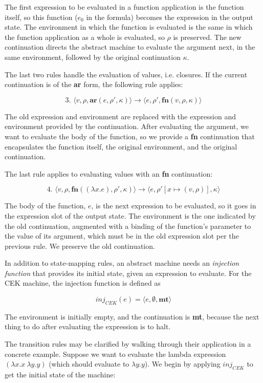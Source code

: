 \documentclass{article}
\begin{document}
The first expression to be evaluated in a function application is the function itself, so this function ($e_0$ in the formula) becomes the expression in the output state. The environment in which the function is evaluated is the same in which the function application as a whole is evaluated, so $\rho$ is preserved. The new continuation directs the abstract machine to evaluate the argument next, in the same environment, followed by the original continuation $\kappa$.

The last two rules handle the evaluation of values, i.e. closures. If the current continuation is of the \textbf{ar} form, the following rule applies:

$$
\text{3. }
\langle v, \rho, \textbf{ar}(e, \rho', \kappa) \rangle
\to
\langle e, \rho', \textbf{fn}(v, \rho, \kappa) \rangle
$$

The old expression and environment are replaced with the expression and environment provided by the continuation. After evaluating the argument, we want to evaluate the body of the function, so we provide a \textbf{fn} continuation that encapsulates the function itself, the original environment, and the original continuation.

The last rule applies to evaluating values with an \textbf{fn} continuation:

$$
\text{4. }
\langle v, \rho, \textbf{fn}((\lambda x.e), \rho', \kappa) \rangle
\to
\langle e, \rho'[x \mapsto (v, \rho)], \kappa \rangle
$$

The body of the function, $e$, is the next expression to be evaluated, so it goes in the expression slot of the output state. The environment is the one indicated by the old continuation, augmented with a binding of the function's parameter to the value of its argument, which must be in the old expression slot per the previous rule. We preserve the old continuation.

In addition to state-mapping rules, an abstract machine needs an \textit{injection function} that provides its initial state, given an expression to evaluate. For the CEK machine, the injection function is defined as

$$ inj_{CEK}(e) = \langle e, \emptyset, \textbf{mt} \rangle $$

The environment is initially empty, and the continuation is \textbf{mt}, because the next thing to do after evaluating the expression is to halt.

The transition rules may be clarified by walking through their application in a concrete example. Suppose we want to evaluate the lambda expression $(\lambda x.x\ \lambda y.y)$ (which should evaluate to $\lambda y.y$). We begin by applying $inj_{CEK}$ to get the initial state of the machine:
\end{document}

